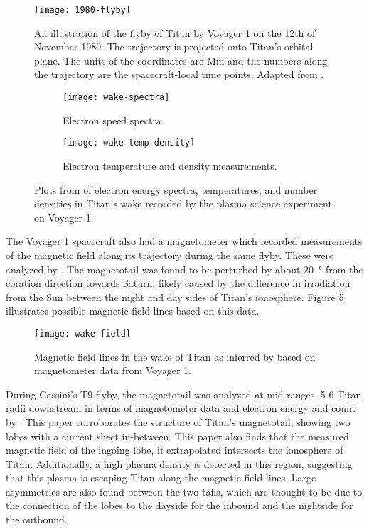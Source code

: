 \documentclass[12pt, parskip=full*, abstract]{scrartcl}
\begin{document}
\begin{figure}[htbp]
	\centering
	\texttt{[image: 1980-flyby]}
	\caption{An illustration of the flyby of Titan by Voyager 1 on the 12th of November 1980. The trajectory is projected onto Titan's orbital plane. The units of the coordinates are \si{\mega\metre} and the numbers along the trajectory are the spacecraft-local time points. Adapted from \textcite{hartle-1982}.}
	\label{fig:1980-flyby}
\end{figure}


\begin{figure}[htbp]
	\begin{subfigure}{\textwidth}
		\centering
		\texttt{[image: wake-spectra]}
		\caption{Electron speed spectra.}
		\label{fig:wake-spectra}	
	\end{subfigure}
	\begin{subfigure}{\textwidth}
		\centering
		\texttt{[image: wake-temp-density]}
		\caption{Electron temperature and density measurements.}
		\label{fig:wake-temp-density}
	\end{subfigure}
	\caption{Plots from \textcite{hartle-1982} of electron energy spectra, temperatures, and number densities in Titan's wake recorded by the plasma science experiment on Voyager 1.}
\end{figure}

The Voyager 1 spacecraft also had a magnetometer which recorded measurements of the magnetic field along its trajectory during the same flyby. These were analyzed by \textcite{ness-1982}. The magnetotail was found to be perturbed by about \SI{20}{\degree} from the coration direction towards Saturn, likely caused by the difference in irradiation from the Sun between the night and day sides of Titan's ionosphere. Figure \ref{fig:wake-field} illustrates possible magnetic field lines based on this data.

\begin{figure}[htbp]
	\centering
	\texttt{[image: wake-field]}
	\caption{Magnetic field lines in the wake of Titan as inferred by \textcite{ness-1982} based on magnetometer data from Voyager 1.}
	\label{fig:wake-field}
\end{figure}

During Cassini's T9 flyby, the magnetotail was analyzed at mid-ranges, 5-6 Titan radii downstream in terms of magnetometer data and electron energy and count by \textcite{Magnetotail-T9}. This paper corroborates the structure of Titan's magnetotail, showing two lobes with a current sheet in-between. This paper also finds that the measured magnetic field of the ingoing lobe, if extrapolated intersects the ionosphere of Titan. Additionally, a high plasma density is detected in this region, suggesting that this plasma is escaping Titan along the magnetic field lines. Large asymmetries are also found
between the two tails, which are thought to be due to the connection of the lobes to the dayside for the inbound and the nightside for the outbound.
\end{document}

